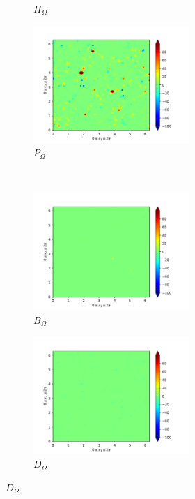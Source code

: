 \begin{figure}[H]
\begin{subfigure}{0.45\textwidth}
        \caption{$\Pi_{\Omega}$}
    \end{subfigure}
    \newline
    \begin{subfigure}{0.45\textwidth}
        \includegraphics[height=1.75in]{media/run-cds-65/P-enst-1320}
        \caption{$P_{\Omega}$}
    \end{subfigure}
    ~
    \begin{subfigure}{0.45\textwidth}
        \includegraphics[height=1.75in]{media/run-cds-65/B-enst-1320}
        \caption{$B_{\Omega}$}
    \end{subfigure}
    \newline
    \begin{subfigure}{0.45\textwidth}
        \includegraphics[height=1.75in]{media/run-cds-65/D-enst-1320}
        \caption{$D_{\Omega}$}
    \end{subfigure}
\end{figure}

\newpage

